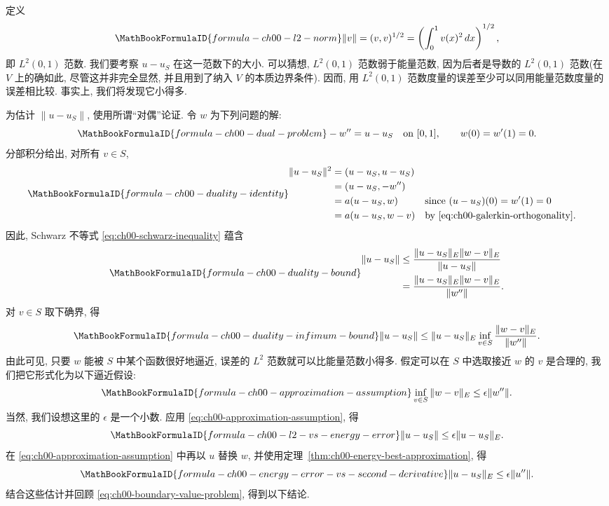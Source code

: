 定义
\[
\MathBookFormulaID{formula-ch00-l2-norm}
\|v\|=(v,v)^{1/2}=\left(\int_0^1v(x)^2\,dx\right)^{1/2},
\]
即 $L^2(0,1)$ 范数. 我们要考察 $u-u_S$ 在这一范数下的大小. 可以猜想, $L^2(0,1)$ 范数弱于能量范数, 因为后者是导数的 $L^2(0,1)$ 范数(在 $V$ 上的确如此, 尽管这并非完全显然, 并且用到了纳入 $V$ 的本质边界条件). 因而, 用 $L^2(0,1)$ 范数度量的误差至少可以同用能量范数度量的误差相比较. 事实上, 我们将发现它小得多.

为估计 $\|u-u_S\|$, 使用所谓``对偶''论证. 令 $w$ 为下列问题的解:
\[
\MathBookFormulaID{formula-ch00-dual-problem}
-w''=u-u_S\quad\text{on }[0,1],
\qquad w(0)=w'(1)=0.
\]
分部积分给出, 对所有 $v\in S$,
\[
\MathBookFormulaID{formula-ch00-duality-identity}
\begin{aligned}
\|u-u_S\|^2
&=(u-u_S,u-u_S)\\
&=(u-u_S,-w'')\\
&=a(u-u_S,w) &&\text{since $(u-u_S)(0)=w'(1)=0$}\\
&=a(u-u_S,w-v) &&\text{by \eqref{eq:ch00-galerkin-orthogonality}}.
\end{aligned}
\]
因此, Schwarz 不等式 \eqref{eq:ch00-schwarz-inequality} 蕴含
\[
\MathBookFormulaID{formula-ch00-duality-bound}
\begin{aligned}
\|u-u_S\|
&\leq\frac{\|u-u_S\|_E\|w-v\|_E}{\|u-u_S\|}\\
&=\frac{\|u-u_S\|_E\|w-v\|_E}{\|w''\|}.
\end{aligned}
\]
对 $v\in S$ 取下确界, 得
\[
\MathBookFormulaID{formula-ch00-duality-infimum-bound}
\|u-u_S\|\leq\|u-u_S\|_E
\inf_{v\in S}\frac{\|w-v\|_E}{\|w''\|}.
\]
由此可见, 只要 $w$ 能被 $S$ 中某个函数很好地逼近, 误差的 $L^2$ 范数就可以比能量范数小得多. 假定可以在 $S$ 中选取接近 $w$ 的 $v$ 是合理的, 我们把它形式化为以下逼近假设:
\setcounter{equation}{3}
\begin{equation}
\MathBookFormulaID{formula-ch00-approximation-assumption}
\inf_{v\in S}\|w-v\|_E\leq\epsilon\|w''\|.
\label{eq:ch00-approximation-assumption}
\end{equation}
当然, 我们设想这里的 $\epsilon$ 是一个小数. 应用 \eqref{eq:ch00-approximation-assumption}, 得
\[
\MathBookFormulaID{formula-ch00-l2-vs-energy-error}
\|u-u_S\|\leq\epsilon\|u-u_S\|_E.
\]
在 \eqref{eq:ch00-approximation-assumption} 中再以 $u$ 替换 $w$, 并使用定理~\ref{thm:ch00-energy-best-approximation}, 得
\[
\MathBookFormulaID{formula-ch00-energy-error-vs-second-derivative}
\|u-u_S\|_E\leq\epsilon\|u''\|.
\]
结合这些估计并回顾 \eqref{eq:ch00-boundary-value-problem}, 得到以下结论.

